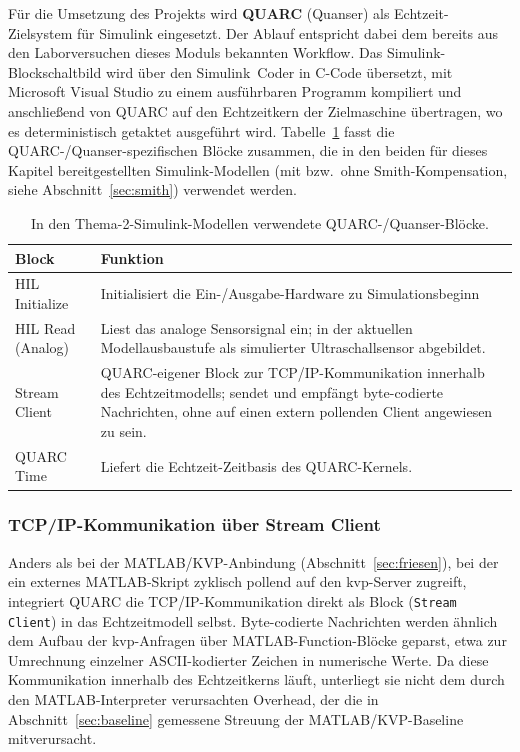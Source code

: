Für die Umsetzung des Projekts wird \textbf{QUARC} (Quanser) als Echtzeit-Zielsystem für Simulink eingesetzt.
Der Ablauf entspricht dabei dem bereits aus den Laborversuchen dieses
Moduls bekannten Workflow.
Das Simulink-Blockschaltbild wird über den
Simulink~Coder in C-Code übersetzt, mit Microsoft Visual Studio zu einem
ausführbaren Programm kompiliert und anschließend von QUARC auf den
Echtzeitkern der Zielmaschine übertragen, wo es deterministisch getaktet
ausgeführt wird. Tabelle~\ref{tab:quarc_bloecke} fasst die
QUARC-/Quanser-spezifischen Blöcke zusammen, die in den beiden für dieses
Kapitel bereitgestellten Simulink-Modellen (mit bzw.\ ohne
Smith-Kompensation, siehe Abschnitt~\ref{sec:smith}) verwendet werden.

\begin{table}[H]
    \centering
    \caption{In den Thema-2-Simulink-Modellen verwendete QUARC-/Quanser-Blöcke.}
    \label{tab:quarc_bloecke}
    \begin{tabular}{p{3.4cm}p{9.8cm}}
        \toprule
        \textbf{Block} & \textbf{Funktion} \\
        \midrule
        HIL Initialize & Initialisiert die Ein-/Ausgabe-Hardware zu Simulationsbeginn \\
        HIL Read (Analog) & Liest das analoge Sensorsignal ein; in der aktuellen Modellausbaustufe als simulierter Ultraschallsensor abgebildet. \\
        Stream Client & QUARC-eigener Block zur TCP/IP-Kommunikation innerhalb des Echtzeitmodells; sendet und empfängt byte-codierte Nachrichten, ohne auf einen extern pollenden Client angewiesen zu sein. \\
        QUARC Time & Liefert die Echtzeit-Zeitbasis des QUARC-Kernels. \\
        \bottomrule
    \end{tabular}
\end{table}

\subsubsection{TCP/IP-Kommunikation über Stream Client}

Anders als bei der MATLAB/KVP-Anbindung (Abschnitt~\ref{sec:friesen}), bei
der ein externes MATLAB-Skript zyklisch pollend auf den \ac{kvp}-Server
zugreift, integriert QUARC die TCP/IP-Kommunikation direkt als Block
(\texttt{Stream Client}) in das Echtzeitmodell selbst. Byte-codierte
Nachrichten werden ähnlich dem Aufbau der \ac{kvp}-Anfragen über
MATLAB-Function-Blöcke geparst, etwa zur Umrechnung einzelner
ASCII-kodierter Zeichen in numerische Werte. Da diese Kommunikation
innerhalb des Echtzeitkerns läuft, unterliegt sie nicht dem durch den
MATLAB-Interpreter verursachten Overhead, der die in
Abschnitt~\ref{sec:baseline} gemessene Streuung der MATLAB/KVP-Baseline
mitverursacht.

